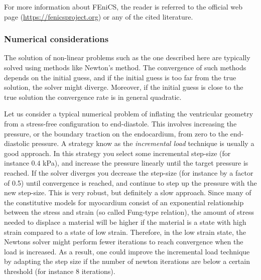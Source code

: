For more information about FEniCS, the reader is referred to the
official web page (\url{https://fenicsproject.org}) or any of the
cited literature.

\subsubsection{Numerical considerations}
The solution of non-linear problems such as the one described here are
typically solved using methods like Newton's method. The convergence of
such methods depends on the initial guess, and if the
initial guess is too far from the true solution, the solver might diverge.
Moreover, if the initial guess is close to the true solution the
convergence rate is in general quadratic.

Let us consider a
typical numerical problem of inflating the ventricular geometry from a
stress-free configuration to end-diastole. This involves increasing
the pressure, or the boundary traction on the endocardium, from zero
to the end-diastolic pressure. A strategy know as the
\emph{incremental load} technique is usually a good approach. In this
strategy you select some incremental step-size (for instance $0.4$
kPa), and increase the pressure linearly until the target pressure is
reached. If the solver diverges you decrease the step-size (for
instance by a factor of 0.5) until convergence is reached, and
continue to step up the pressure with the new step-size. This is very
robust, but definitely a slow approach. Since many of the 
constitutive models for myocardium consist of an exponential
relationship between the stress and strain (so called Fung-type
relation), the amount of stress needed to displace a material will be
higher if the material is a state with high strain compared to a state
of low strain. Therefore, in the low strain state, the Newtons solver
might perform fewer iterations to reach convergence when the load is increased. As a
result, one could improve the incremental load technique by adapting
the step size if the number of newton iterations are below a certain
threshold (for instance $8$ iterations).

